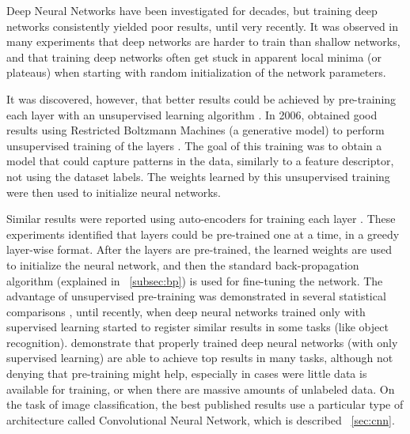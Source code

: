 Deep Neural Networks have been investigated for decades, but training deep networks consistently yielded poor results, until very recently. It was observed in many experiments that deep networks are harder to train than shallow networks, and that training deep networks often get stuck in apparent local minima (or plateaus) when starting with random initialization of the network parameters.

It was discovered, however, that better results could be achieved by pre-training each layer with an unsupervised learning algorithm \cite{hinton2006fast}. In 2006, \citeauthor{hinton2006fast} obtained good results using Restricted Boltzmann Machines (a generative model) to perform unsupervised training of the layers \cite{hinton2006fast}. The goal of this training was to obtain a model that could capture patterns in the data, similarly to a feature descriptor, not using the dataset labels. The weights learned by this unsupervised training were then used to initialize neural networks. 

\indent Similar results were reported using auto-encoders for training each layer \cite{bengio2007greedy}. These experiments identified that layers could be pre-trained one at a time, in a greedy layer-wise format. After the layers are pre-trained, the learned weights are used to initialize the neural network, and then the standard back-propagation algorithm (explained in ~\ref{subsec:bp}) is used for fine-tuning the network. The advantage of unsupervised pre-training was demonstrated in several statistical comparisons \cite{bengio2007greedy,larochelle2007empirical,erhan2009difficulty}, until recently, when deep neural networks trained only with supervised learning started to register similar results in some tasks (like object recognition). \citealt{ciresan2012multi} demonstrate that properly trained deep neural networks (with only supervised learning) are able to achieve top results in many tasks, although not denying that pre-training might help, especially in cases were little data is available for training, or when there are massive amounts of unlabeled data. On the task of image classification, the best published results use a particular type of architecture called Convolutional Neural Network, which is described ~\ref{sec:cnn}.




